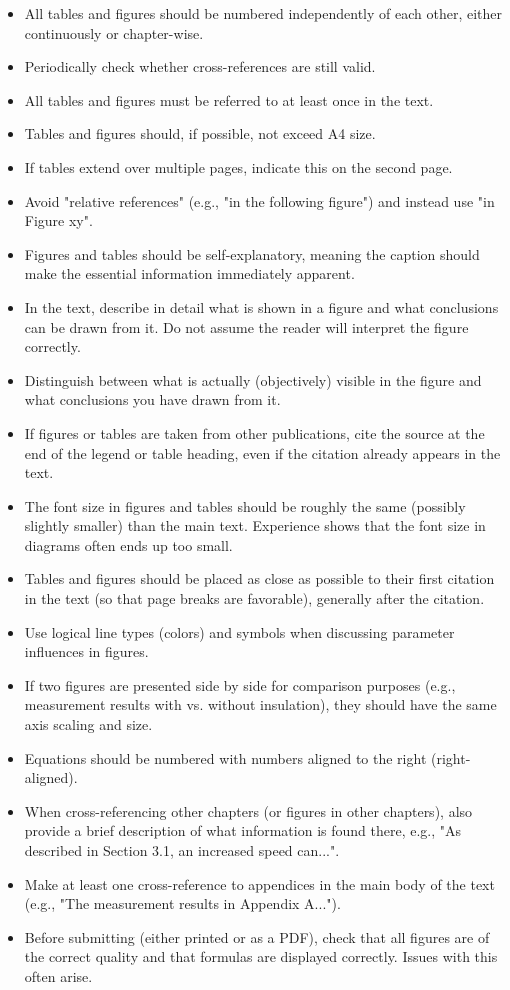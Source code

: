 \documentclass[a4paper, fleqn, headsepline, footsepline, 12pt, parskip=half]{scrartcl}
\begin{document}
\begin{itemize}
    \item All tables and figures should be numbered independently of each other, either continuously or chapter-wise.
    \item Periodically check whether cross-references are still valid.
    \item All tables and figures must be referred to at least once in the text.
    \item Tables and figures should, if possible, not exceed A4 size.
    \item If tables extend over multiple pages, indicate this on the second page.
    \item Avoid "relative references" (e.g., "in the following figure") and instead use "in Figure xy".
    \item Figures and tables should be self-explanatory, meaning the caption should make the essential information immediately apparent.
    \item In the text, describe in detail what is shown in a figure and what conclusions can be drawn from it. Do not assume the reader will interpret the figure correctly.
    \item Distinguish between what is actually (objectively) visible in the figure and what conclusions you have drawn from it.
    \item If figures or tables are taken from other publications, cite the source at the end of the legend or table heading, even if the citation already appears in the text.
    \item The font size in figures and tables should be roughly the same (possibly slightly smaller) than the main text. Experience shows that the font size in diagrams often ends up too small.
    \item Tables and figures should be placed as close as possible to their first citation in the text (so that page breaks are favorable), generally after the citation.
    \item Use logical line types (colors) and symbols when discussing parameter influences in figures.
    \item If two figures are presented side by side for comparison purposes (e.g., measurement results with vs. without insulation), they should have the same axis scaling and size.
    \item Equations should be numbered with numbers aligned to the right (right-aligned).
    \item When cross-referencing other chapters (or figures in other chapters), also provide a brief description of what information is found there, e.g., "As described in Section 3.1, an increased speed can...".
    \item Make at least one cross-reference to appendices in the main body of the text (e.g., "The measurement results in Appendix A...").
    \item Before submitting (either printed or as a PDF), check that all figures are of the correct quality and that formulas are displayed correctly. Issues with this often arise.
\end{itemize}
\end{document}
